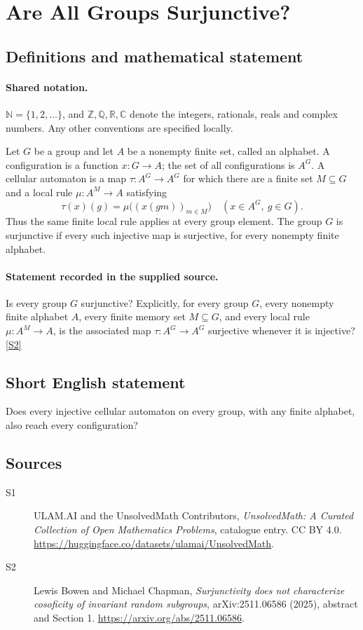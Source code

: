 \documentclass[11pt]{article}
\newcommand{\sref}[2]{\hyperlink{source:#1:#2}{[S#2]}}
\begin{document}
\section{Are All Groups Surjunctive?}\label{statement}

\subsection{Definitions and mathematical statement}

\paragraph{Shared notation.}$\mathbb N=\{1,2,\ldots\}$, and $\mathbb Z,\mathbb Q,\mathbb R,\mathbb C$ denote the integers, rationals, reals and complex numbers. Any other conventions are specified locally.


Let \(G\) be a group and let \(A\) be a nonempty finite set, called
an alphabet.  A configuration is a function \(x:G\to A\); the set of all
configurations is \(A^G\).  A cellular automaton is a map
\(\tau:A^G\to A^G\) for which there are a finite set \(M\subseteq G\)
and a local rule \(\mu:A^M\to A\) satisfying
\[
 \tau(x)(g)=\mu\bigl((x(gm))_{m\in M}\bigr)
       \quad (x\in A^G,\ g\in G).
\]
Thus the same finite local rule applies at every group element.
The group \(G\) is surjunctive if every such injective map is surjective,
for every nonempty finite alphabet.
\paragraph{Statement recorded in the supplied source.}
Is every group \(G\) surjunctive?  Explicitly, for every group
\(G\), every nonempty finite alphabet \(A\), every finite memory set
\(M\subseteq G\), and every local rule \(\mu:A^M\to A\), is the
associated map \(\tau:A^G\to A^G\) surjective whenever it is injective? \sref{statement}{2}
\subsection{Short English statement}
Does every injective cellular automaton on every group, with any finite alphabet, also reach every configuration?
\subsection{Sources}
\begin{description}
\item[\hypertarget{source:statement:1}{S1}] ULAM.AI and the UnsolvedMath Contributors, \emph{UnsolvedMath: A Curated Collection of Open Mathematics Problems}, catalogue entry. CC BY 4.0. \url{https://huggingface.co/datasets/ulamai/UnsolvedMath}.
\item[\hypertarget{source:statement:2}{S2}] Lewis Bowen and Michael Chapman, \emph{Surjunctivity does not characterize cosoficity of invariant random subgroups}, arXiv:2511.06586 (2025), abstract and Section 1. \url{https://arxiv.org/abs/2511.06586}.
\end{description}
\label{end:statement}
\end{document}

